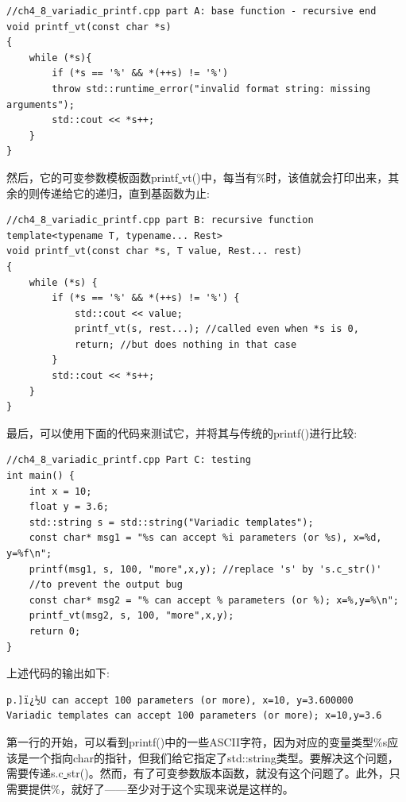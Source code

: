 \begin{lstlisting}[caption={}]
//ch4_8_variadic_printf.cpp part A: base function - recursive end
void printf_vt(const char *s)
{
	while (*s){
		if (*s == '%' && *(++s) != '%')
		throw std::runtime_error("invalid format string: missing arguments");
		std::cout << *s++;
	}
}
\end{lstlisting}

然后，它的可变参数模板函数printf\underline{ }vt()中，每当有\%时，该值就会打印出来，其余的则传递给它的递归，直到基函数为止: \par

\begin{lstlisting}[caption={}]
//ch4_8_variadic_printf.cpp part B: recursive function
template<typename T, typename... Rest>
void printf_vt(const char *s, T value, Rest... rest)
{
	while (*s) {
		if (*s == '%' && *(++s) != '%') {
			std::cout << value;
			printf_vt(s, rest...); //called even when *s is 0,
			return; //but does nothing in that case
		}
		std::cout << *s++;
	}
}
\end{lstlisting}

最后，可以使用下面的代码来测试它，并将其与传统的printf()进行比较: \par

\begin{lstlisting}[caption={}]
//ch4_8_variadic_printf.cpp Part C: testing
int main() {
	int x = 10;
	float y = 3.6;
	std::string s = std::string("Variadic templates");
	const char* msg1 = "%s can accept %i parameters (or %s), x=%d, y=%f\n";
	printf(msg1, s, 100, "more",x,y); //replace 's' by 's.c_str()'
	//to prevent the output bug
	const char* msg2 = "% can accept % parameters (or %); x=%,y=%\n";
	printf_vt(msg2, s, 100, "more",x,y);
	return 0;
}
\end{lstlisting}

上述代码的输出如下: \par

\begin{lstlisting}[caption={}]
p.]ï¿½U can accept 100 parameters (or more), x=10, y=3.600000
Variadic templates can accept 100 parameters (or more); x=10,y=3.6
\end{lstlisting}

第一行的开始，可以看到printf()中的一些ASCII字符，因为对应的变量类型\%s应该是一个指向char的指针，但我们给它指定了std::string类型。要解决这个问题，需要传递s.c\underline{ }str()。然而，有了可变参数版本函数，就没有这个问题了。此外，只需要提供\%，就好了——至少对于这个实现来说是这样的。 \par

